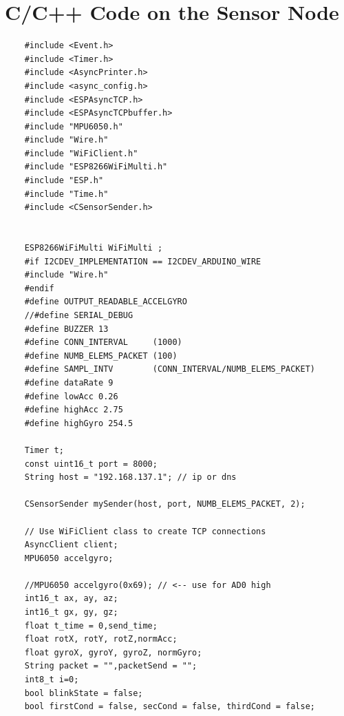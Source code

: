 \documentclass[letterpaper,12pt,titlepage,oneside,final]{book}
\begin{document}
\chapter{C/C++ Code on the Sensor Node}
\begin{lstlisting}
	#include <Event.h>
	#include <Timer.h>
	#include <AsyncPrinter.h>
	#include <async_config.h>
	#include <ESPAsyncTCP.h>
	#include <ESPAsyncTCPbuffer.h>
	#include "MPU6050.h"
	#include "Wire.h"
	#include "WiFiClient.h"
	#include "ESP8266WiFiMulti.h"
	#include "ESP.h"
	#include "Time.h"
	#include <CSensorSender.h>
	
	
	ESP8266WiFiMulti WiFiMulti ;
	#if I2CDEV_IMPLEMENTATION == I2CDEV_ARDUINO_WIRE
	#include "Wire.h"
	#endif
	#define OUTPUT_READABLE_ACCELGYRO
	//#define SERIAL_DEBUG
	#define BUZZER 13
	#define CONN_INTERVAL     (1000)
	#define NUMB_ELEMS_PACKET (100)
	#define SAMPL_INTV        (CONN_INTERVAL/NUMB_ELEMS_PACKET)
	#define dataRate 9
	#define lowAcc 0.26
	#define highAcc 2.75
	#define highGyro 254.5
	
	Timer t;
	const uint16_t port = 8000;
	String host = "192.168.137.1"; // ip or dns
	
	CSensorSender mySender(host, port, NUMB_ELEMS_PACKET, 2);
	
	// Use WiFiClient class to create TCP connections
	AsyncClient client;   
	MPU6050 accelgyro;
	
	//MPU6050 accelgyro(0x69); // <-- use for AD0 high
	int16_t ax, ay, az;
	int16_t gx, gy, gz;
	float t_time = 0,send_time;
	float rotX, rotY, rotZ,normAcc;
	float gyroX, gyroY, gyroZ, normGyro;
	String packet = "",packetSend = "";
	int8_t i=0;
	bool blinkState = false;
	bool firstCond = false, secCond = false, thirdCond = false;
	

\end{lstlisting}
\end{document}
